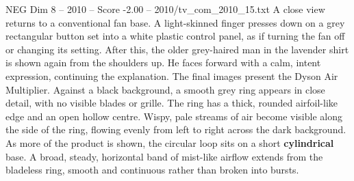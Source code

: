\begin{textsample}{NEG Dim 8 – 2010 – Score -2.00 – 2010/tv\_com\_2010\_15.txt}
A close view returns to a conventional fan base.
A light-skinned finger presses down on a grey rectangular button set into a white plastic control panel, as if turning the fan off or changing its setting.
After this, the older grey-haired man in the lavender shirt is shown again from the shoulders up.
He faces forward with a calm, intent expression, continuing the explanation.
The final images present the Dyson Air Multiplier.
Against a black background, a smooth grey ring appears in close detail, with no visible blades or grille.
The ring has a thick, rounded airfoil-like edge and an open hollow centre.
Wispy, pale streams of air become visible along the side of the ring, flowing evenly from left to right across the dark background.
As more of the product is shown, the circular loop sits on a short \textbf{cylindrical} base.
A broad, steady, horizontal band of mist-like airflow extends from the bladeless ring, smooth and continuous rather than broken into bursts.

\end{textsample}
